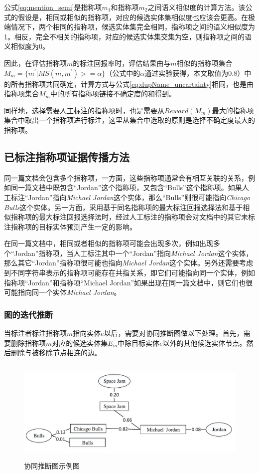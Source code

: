 公式\ref{eq:mention_semi}是指称项$m_1$和指称项$m_2$之间语义相似度的计算方法。该公式的假设是，相同或相似的指称项，对应的候选实体集相似度也应该会更高。在极端情况下，两个相同的指称项，候选实体集完全相同，指称项之间的语义相似度为1。相反，完全不相关的指称项，对应的候选实体集交集为空，则指称项之间的语义相似度为0。

因此，在评估指称项$m$的标注回报率时，评估结果由与$m$相似的指称项集合$M_m=\{m^{'}|MS(m,m^{'})>=\alpha\}$（公式中的$\alpha$通过实验获得，本文取值为0.8）中的所有指称项共同确定，计算方式与公式\ref{eq:dupName_uncartainty}相同，也是由指称项集合$M_m$中的所有指称项链接不确定度的和得到。

同样地，选择需要人工标注的指称项时，也是需要从$Reward(M_m)$最大的指称项集合中取出一个指称项进行标注，这里从集合中选取的原则是选择不确定度最大的指称项。

\subsection{已标注指称项证据传播方法}\label{section:anno_propagate}
同一篇文档会包含多个指称项，一方面，这些指称项通常会有相互关联的关系，例如同一篇文档中既包含“Jordan”这个指称项，又包含“Bulls”这个指称项。如果人工标注“Jordan”指向\textit{Michael Jordan}这个实体，那么“Bulls”则很可能指向\textit{Chicago Bulls}这个实体。另一方面，采用基于同名指称项的最大标注回报选择法和基于相似指称项的最大标注回报选择法时，经过人工标注的指称项会对文档中的其它未标注指称项的目标实体预测产生一定的影响。

在同一篇文档中，相同或者相似的指称项可能会出现多次，例如出现多个“Jordan”指称项，当人工标注其中一个“Jordan”指向\textit{Michael Jordan}这个实体，那么其它“Jordan”指称项很可能也指向\textit{Michael Jordan}这个实体。另外还需要考虑到不同字符串表示的指称项可能存在共指关系，即它们可能指向同一个实体，例如指称项“Jordan”和指称项“Michael Jordan”如果出现在同一篇文档中，则它们也很可能指向同一个实体\textit{Michael Jordan}。

\subsubsection {图的迭代推断}
当标注者标注指称项$m$指向实体$e$以后，需要对协同推断图做以下处理。首先，需要删除指称项$m$对应的候选实体集$E_m$中除目标实体$e$以外的其他候选实体节点。然后删除与被移除节点相连的边。

\begin{figure}[!htb]
	\centering\includegraphics[height=5cm]{resource/EL_Graph_modify}
	\caption{协同推断图示例图}
	\label{fig:el_graph_modify}
\end{figure}

